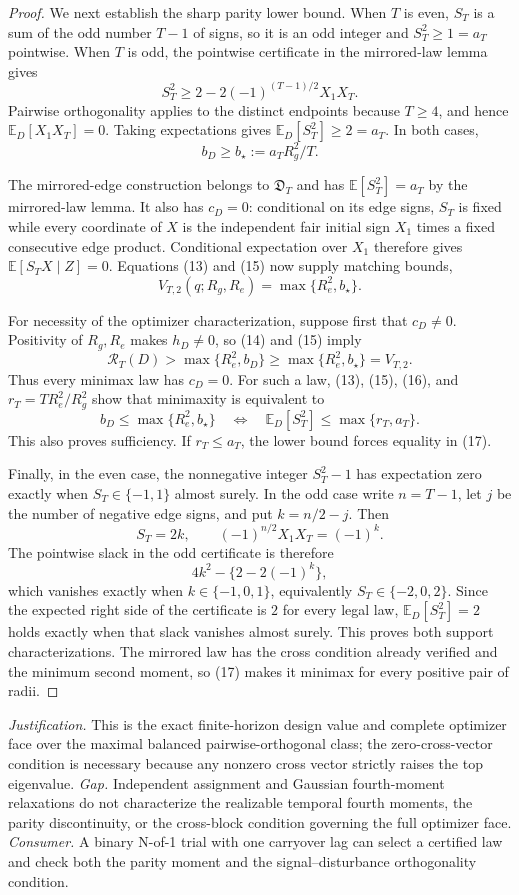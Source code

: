 \documentclass{article}
\begin{document}
\begin{proof}
We next establish the sharp parity lower bound.  When \(T\) is even, \(S_T\) is a sum of the odd number \(T-1\) of signs, so it is an odd integer and \(S_T^2\ge1=a_T\) pointwise.  When \(T\) is odd, the pointwise certificate in the mirrored-law lemma gives
\[
S_T^2\ge2-2(-1)^{(T-1)/2}X_1X_T.
\]
Pairwise orthogonality applies to the distinct endpoints because \(T\ge4\), and hence \(\mathbb E_D[X_1X_T]=0\).  Taking expectations gives \(\mathbb E_D[S_T^2]\ge2=a_T\).  In both cases,
\[
b_D\ge b_\star:=a_TR_g^2/T.
\tag{15}
\]

The mirrored-edge construction belongs to \(\mathfrak D_T\) and has \(\mathbb E[S_T^2]=a_T\) by the mirrored-law lemma.  It also has \(c_D=0\): conditional on its edge signs, \(S_T\) is fixed while every coordinate of \(X\) is the independent fair initial sign \(X_1\) times a fixed consecutive edge product.  Conditional expectation over \(X_1\) therefore gives \(\mathbb E[S_TX\mid Z]=0\).  Equations (13) and (15) now supply matching bounds,
\[
V_{T,2}(q;R_g,R_e)=\max\{R_e^2,b_\star\}.
\tag{16}
\]

For necessity of the optimizer characterization, suppose first that \(c_D\ne0\).  Positivity of \(R_g,R_e\) makes \(h_D\ne0\), so (14) and (15) imply
\[
\mathcal R_T(D)>\max\{R_e^2,b_D\}
\ge\max\{R_e^2,b_\star\}=V_{T,2}.
\]
Thus every minimax law has \(c_D=0\).  For such a law, (13), (15), (16), and \(r_T=TR_e^2/R_g^2\) show that minimaxity is equivalent to
\[
b_D\le\max\{R_e^2,b_\star\}
\quad\Longleftrightarrow\quad
\mathbb E_D[S_T^2]\le\max\{r_T,a_T\}.
\tag{17}
\]
This also proves sufficiency.  If \(r_T\le a_T\), the lower bound forces equality in (17).

Finally, in the even case, the nonnegative integer \(S_T^2-1\) has expectation zero exactly when \(S_T\in\{-1,1\}\) almost surely.  In the odd case write \(n=T-1\), let \(j\) be the number of negative edge signs, and put \(k=n/2-j\).  Then
\[
S_T=2k,
\qquad
(-1)^{n/2}X_1X_T=(-1)^k.
\]
The pointwise slack in the odd certificate is therefore
\[
4k^2-\{2-2(-1)^k\},
\]
which vanishes exactly when \(k\in\{-1,0,1\}\), equivalently \(S_T\in\{-2,0,2\}\).  Since the expected right side of the certificate is \(2\) for every legal law, \(\mathbb E_D[S_T^2]=2\) holds exactly when that slack vanishes almost surely.  This proves both support characterizations.  The mirrored law has the cross condition already verified and the minimum second moment, so (17) makes it minimax for every positive pair of radii.
\end{proof}
\par\smallskip\noindent \textit{Justification.} This is the exact finite-horizon design value and complete optimizer face over the maximal balanced pairwise-orthogonal class; the zero-cross-vector condition is necessary because any nonzero cross vector strictly raises the top eigenvalue. \textit{Gap.} Independent assignment and Gaussian fourth-moment relaxations do not characterize the realizable temporal fourth moments, the parity discontinuity, or the cross-block condition governing the full optimizer face. \textit{Consumer.} A binary N-of-1 trial with one carryover lag can select a certified law and check both the parity moment and the signal--disturbance orthogonality condition.
\end{document}

